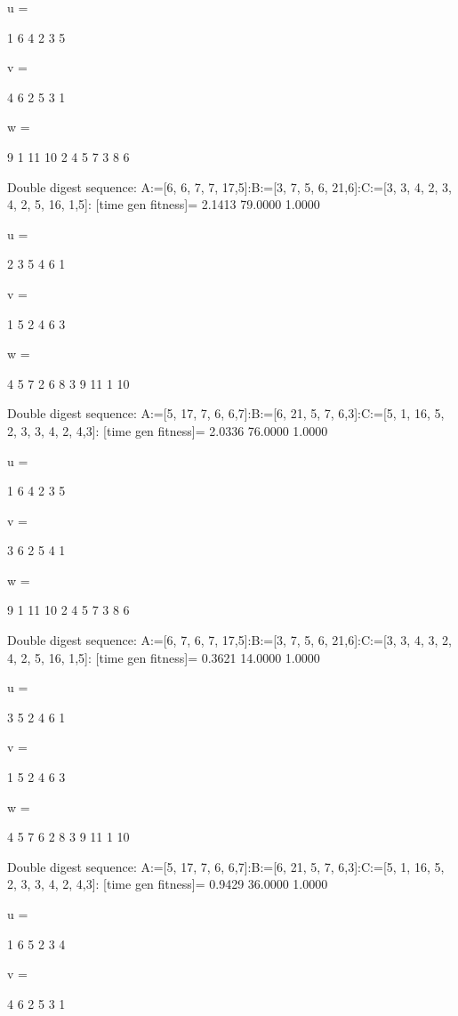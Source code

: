 u =

     1     6     4     2     3     5


v =

     4     6     2     5     3     1


w =

     9     1    11    10     2     4     5     7     3     8     6

Double digest sequence:
A:=[6, 6, 7, 7, 17,5]:B:=[3, 7, 5, 6, 21,6]:C:=[3, 3, 4, 2, 3, 4, 2, 5, 16, 1,5]:
[time gen fitness]=
    2.1413   79.0000    1.0000


u =

     2     3     5     4     6     1


v =

     1     5     2     4     6     3


w =

     4     5     7     2     6     8     3     9    11     1    10

Double digest sequence:
A:=[5, 17, 7, 6, 6,7]:B:=[6, 21, 5, 7, 6,3]:C:=[5, 1, 16, 5, 2, 3, 3, 4, 2, 4,3]:
[time gen fitness]=
    2.0336   76.0000    1.0000


u =

     1     6     4     2     3     5


v =

     3     6     2     5     4     1


w =

     9     1    11    10     2     4     5     7     3     8     6

Double digest sequence:
A:=[6, 7, 6, 7, 17,5]:B:=[3, 7, 5, 6, 21,6]:C:=[3, 3, 4, 3, 2, 4, 2, 5, 16, 1,5]:
[time gen fitness]=
    0.3621   14.0000    1.0000


u =

     3     5     2     4     6     1


v =

     1     5     2     4     6     3


w =

     4     5     7     6     2     8     3     9    11     1    10

Double digest sequence:
A:=[5, 17, 7, 6, 6,7]:B:=[6, 21, 5, 7, 6,3]:C:=[5, 1, 16, 5, 2, 3, 3, 4, 2, 4,3]:
[time gen fitness]=
    0.9429   36.0000    1.0000


u =

     1     6     5     2     3     4


v =

     4     6     2     5     3     1


